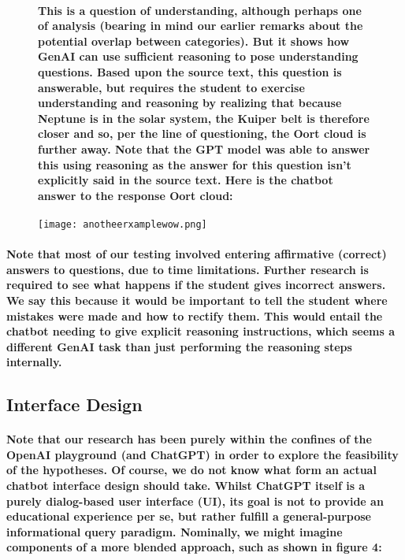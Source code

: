 \documentclass{article}
\begin{document}
\begin{figure}[htbp]

\paragraph{This is a question of understanding, although perhaps one of analysis (bearing in mind our earlier remarks about the potential overlap between categories). But it shows how GenAI can use sufficient reasoning to pose understanding questions. Based upon the source text, this question is answerable, but requires the student to exercise understanding and reasoning by realizing that because Neptune is in the solar system, the Kuiper belt is therefore closer and so, per the line of questioning, the Oort cloud is further away. Note that the GPT model was able to answer this using reasoning as the answer for this question isn’t explicitly said in the source text. Here is the chatbot answer to the response Oort cloud:\newline}

    \centering
    \texttt{[image: anotheerxamplewow.png]}
    \label{fig:another_example}
\end{figure}

\paragraph{Note that most of our testing involved entering affirmative (correct) answers to questions, due to time limitations. Further research is required to see what happens if the student gives incorrect answers. We say this because it would be important to tell the student where mistakes were made and how to rectify them. This would entail the chatbot needing to give explicit reasoning instructions, which seems a different GenAI task than just performing the reasoning steps internally.}

\newpage

\subsection*{Interface Design}

\paragraph{Note that our research has been purely within the confines of the OpenAI playground (and ChatGPT) in order to explore the feasibility of the hypotheses. Of course, we do not know what form an actual chatbot interface design should take. Whilst ChatGPT itself is a purely dialog-based user interface (UI), its goal is not to provide an educational experience per se, but rather fulfill a general-purpose informational query paradigm. Nominally, we might imagine components of a more blended approach, such as shown in figure 4:}
\end{document}
